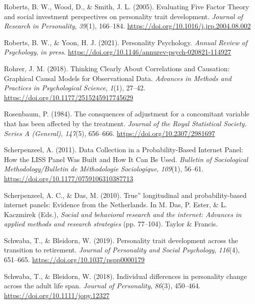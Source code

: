 \documentclass[
  english,
  man, noextraspace]{apa7}
\begin{document}
\leavevmode\hypertarget{ref-robertsEvaluatingFiveFactor2005}{}%
Roberts, B. W., Wood, D., \& Smith, J. L. (2005). Evaluating Five Factor Theory and social investment perspectives on personality trait development. \emph{Journal of Research in Personality}, \emph{39}(1), 166--184. \url{https://doi.org/10.1016/j.jrp.2004.08.002}

\leavevmode\hypertarget{ref-robertsPersonalityPsychology2021}{}%
Roberts, B. W., \& Yoon, H. J. (2021). Personality Psychology. \emph{Annual Review of Psychology}, \emph{in press}. \url{https://doi.org/10.1146/annurev-psych-020821-114927}

\leavevmode\hypertarget{ref-rohrerThinkingClearlyCorrelations2018}{}%
Rohrer, J. M. (2018). Thinking Clearly About Correlations and Causation: Graphical Causal Models for Observational Data. \emph{Advances in Methods and Practices in Psychological Science}, \emph{1}(1), 27--42. \url{https://doi.org/10.1177/2515245917745629}

\leavevmode\hypertarget{ref-rosenbaumConsquencesAdjustmentConcomitant1984}{}%
Rosenbaum, P. (1984). The consquences of adjustment for a concomitant variable that has been affected by the treatment. \emph{Journal of the Royal Statistical Society. Series A (General)}, \emph{147}(5), 656--666. \url{https://doi.org/10.2307/2981697}

\leavevmode\hypertarget{ref-scherpenzeelDataCollectionProbabilityBased2011}{}%
Scherpenzeel, A. (2011). Data Collection in a Probability-Based Internet Panel: How the LISS Panel Was Built and How It Can Be Used. \emph{Bulletin of Sociological Methodology/Bulletin de Méthodologie Sociologique}, \emph{109}(1), 56--61. \url{https://doi.org/10.1177/0759106310387713}

\leavevmode\hypertarget{ref-scherpenzeelTrueLongitudinalProbabilitybased2010}{}%
Scherpenzeel, A. C., \& Das, M. (2010). True'' longitudinal and probability-based internet panels: Evidence from the Netherlands. In M. Das, P. Ester, \& L. Kaczmirek (Eds.), \emph{Social and behavioral research and the internet: Advances in applied methods and research strategies} (pp. 77--104). Taylor \& Francis.

\leavevmode\hypertarget{ref-schwabaPersonalityTraitDevelopment2019}{}%
Schwaba, T., \& Bleidorn, W. (2019). Personality trait development across the transition to retirement. \emph{Journal of Personality and Social Psychology}, \emph{116}(4), 651--665. \url{https://doi.org/10.1037/pspp0000179}

\leavevmode\hypertarget{ref-schwabaIndividualDifferencesPersonality2018}{}%
Schwaba, T., \& Bleidorn, W. (2018). Individual differences in personality change across the adult life span. \emph{Journal of Personality}, \emph{86}(3), 450--464. \url{https://doi.org/10.1111/jopy.12327}
\end{document}
